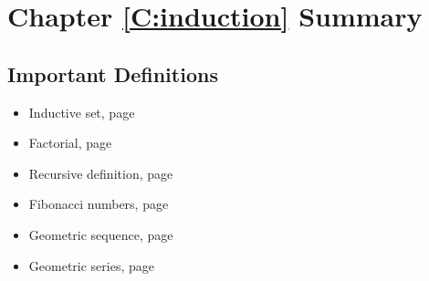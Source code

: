 \newpage
\section{Chapter \ref{C:induction} Summary}

\subsection*{Important Definitions}
\begin{multicols}{2}
\begin{itemize}
\item Inductive set, page~\pageref*{D:inductiveset}
\item Factorial, page~\pageref*{factorial2}
\item Recursive definition, page~\pageref*{recursivedef}
\item Fibonacci numbers, page~\pageref*{fibonacci}
\item Geometric sequence, page~\pageref*{geomseq}
\item Geometric series, page~\pageref*{geometricseries}
\end{itemize}
\end{multicols}
\hbreak



